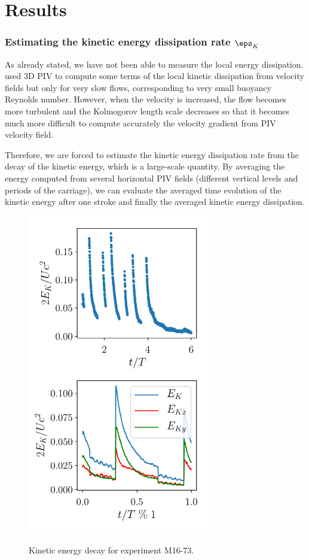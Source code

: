 \section{Results}

\subsubsection{Estimating the kinetic energy dissipation rate $\eps_K$}

As already stated, we have not been able to measure the local energy
dissipation. \cite{PraudFinchamSommeria2005} used 3D PIV to compute some terms
of the local kinetic dissipation from velocity fields but only for very slow
flows, corresponding to very small buoyancy Reynolds number. However, when the
velocity is increased, the flow becomes more turbulent and the Kolmogorov
length scale decreases so that it becomes much more difficult to compute
accurately the velocity gradient from PIV velocity field.

Therefore, we are forced to estimate the kinetic energy dissipation rate from
the decay of the kinetic energy, which is a large-scale quantity. By averaging
the energy computed from several horizontal PIV fields (different vertical
levels and periods of the carriage), we can evaluate the averaged time
evolution of the kinetic energy after one stroke and finally the averaged
kinetic energy dissipation.

\begin{figure}[htp!]
\includegraphics[width=80mm]{tmp/fig_energy_vs_time}
\label{fig:energy:vs:time}

\caption{Kinetic energy decay for experiment M16-73.}

\end{figure}

